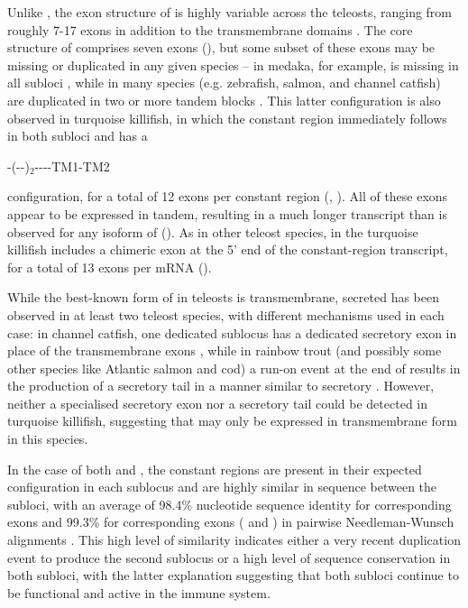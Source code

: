 		Unlike , the exon structure of  is highly variable across the teleosts, ranging from roughly 7-17 \cd{} exons in addition to the transmembrane domains \parencite{fillatreau2013astonishing}. The core structure of  comprises seven \cd{} exons (), but some subset of these exons may be missing or duplicated in any given species -- in medaka, for example,  is missing in all subloci \parencite{magadan2011medaka}, while in many species (e.g. zebrafish, salmon, and channel catfish)  are duplicated in two or more tandem blocks \parencite{fillatreau2013astonishing}. This latter configuration is also observed in turquoise killifish, in which the  constant region immediately follows  in both subloci and has a 

-(--)$_2$----TM1-TM2 

	\noindent configuration, for a total of 12 exons per  constant region (, ). All of these exons appear to be expressed in tandem, resulting in a much longer transcript than is observed for any isoform of  (). As in other teleost species,  in the turquoise killifish includes a chimeric  exon at the 5' end of the constant-region transcript, for a total of 13 exons per  mRNA ().

	While the best-known form of  in teleosts is transmembrane, secreted  has been observed in at least two teleost species, with different mechanisms used in each case: in channel catfish, one dedicated sublocus has a dedicated  secretory exon in place of the transmembrane exons \parencite{bengten2006catfish}, while in rainbow trout (and possibly some other species like Atlantic salmon and cod) a run-on event at the end of  results in the production of a secretory tail in a manner similar to secretory  \parencite{ramirezgomez2012secretoryigd}. However, neither a specialised secretory exon nor a  secretory tail could be detected in turquoise killifish, suggesting that  may only be expressed in transmembrane form in this species.
	
	In the case of both  and , the constant regions are present in their expected configuration in each sublocus and are highly similar in sequence between the subloci, with an average of 98.4\% nucleotide sequence identity for corresponding  exons and 99.3\% for corresponding  exons ( and ) in pairwise Needleman-Wunsch alignments \parencite{needleman1970align}. This high level of similarity indicates either a very recent duplication event to produce the second sublocus or a high level of sequence conservation in both subloci, with the latter explanation suggesting that both subloci continue to be functional and active in the immune system.
	
